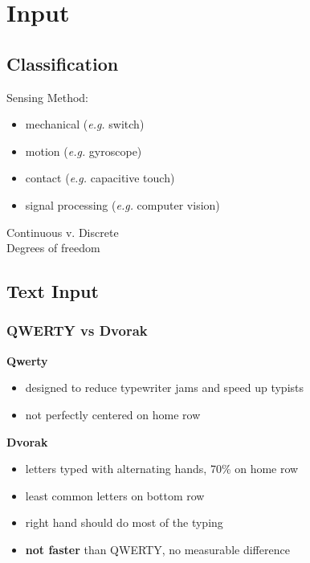 \documentclass[]{article}
\theoremstyle{definition}
\begin{document}
	\section{Input}
	\subsection{Classification}
	Sensing Method:
	\begin{itemize}
		\item mechanical (\textit{e.g.} switch)
		\item motion (\textit{e.g.} gyroscope)
		\item contact (\textit{e.g.} capacitive touch)
		\item signal processing (\textit{e.g.} computer vision)
	\end{itemize}
	Continuous v. Discrete \\
	Degrees of freedom

	\subsection{Text Input}
	\subsubsection{QWERTY vs Dvorak}
	\textbf{Qwerty}
	\begin{itemize}
		\item designed to reduce typewriter jams and speed up typists
		\item not perfectly centered on home row
	\end{itemize}
	\textbf{Dvorak}
	\begin{itemize}
		\item letters typed with alternating hands, 70\% on home row
		\item least common letters on bottom row
		\item right hand should do most of the typing
		\item \textbf{not faster} than QWERTY, no measurable difference
	\end{itemize}
\end{document}
